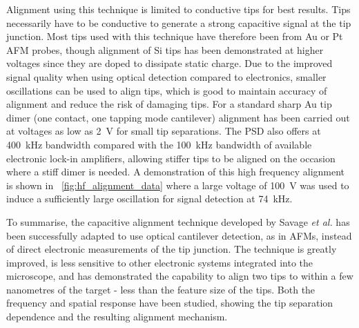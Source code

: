 \documentclass{article}
\begin{document}
Alignment using this technique is limited to conductive tips for best results. Tips necessarily have to be conductive to generate a strong capacitive signal at the tip junction. Most tips used with this technique have therefore been from Au or Pt AFM probes, though alignment of Si tips has been demonstrated at higher voltages since they are doped to dissipate static charge. Due to the improved signal quality when using optical detection compared to electronics, smaller oscillations can be used to align tips, which is good to maintain accuracy of alignment and reduce the risk of damaging tips. For a standard sharp Au tip dimer (one contact, one tapping mode cantilever) alignment has been carried out at voltages as low as \SI{2}{V} for small tip separations. The PSD also offers at \SI{400}{kHz} bandwidth compared with the \SI{100}{kHz} bandwidth of available electronic lock-in amplifiers, allowing stiffer tips to be aligned on the occasion where a stiff dimer is needed. A demonstration of this high frequency alignment is shown in \figurename~\ref{fig:hf_alignment_data} where a large voltage of \SI{100}{V} was used to induce a sufficiently large oscillation for signal detection at \SI{74}{kHz}.

To summarise, the capacitive alignment technique developed by Savage \textit{et al.} \cite{savage2011} has been successfully adapted to use optical cantilever detection, as in AFMs, instead of direct electronic measurements of the tip junction. The technique is greatly improved, is less sensitive to other electronic systems integrated into the microscope, and has demonstrated the capability to align two tips to within a few nanometres of the target - less than the feature size of the tips. Both the frequency and spatial response have been studied, showing the tip separation dependence and the resulting alignment mechanism.
\end{document}
